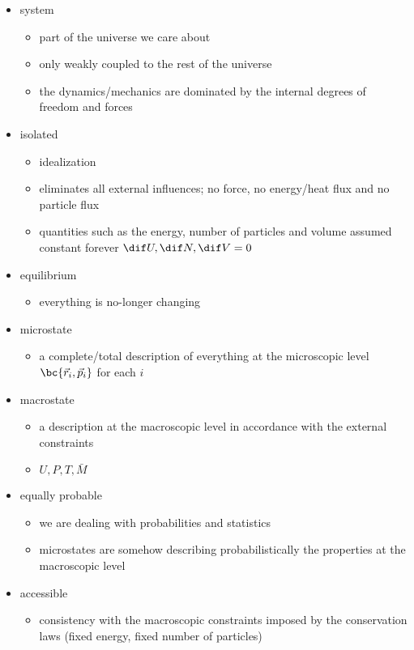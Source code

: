 \documentclass{article}
\begin{document}
\begin{itemize}
    \item system
    \begin{itemize}
        \item part of the universe we care about
        \item only weakly coupled to the rest of the universe
        \item the dynamics/mechanics are dominated by the internal degrees of freedom and forces
    \end{itemize}
    \item isolated
    \begin{itemize}
        \item idealization
        \item eliminates all external influences; no force, no energy/heat flux and no particle flux
        \item quantities such as the energy, number of particles and volume assumed constant forever $\dif U, \dif N, \dif V = 0$
    \end{itemize}
    \item equilibrium
    \begin{itemize}
        \item everything is no-longer changing
    \end{itemize}
    \item microstate
    \begin{itemize}
        \item a complete/total description of everything at the microscopic level $\bc{\vec{r}_i, \vec{p}_i}$ for each $i$
    \end{itemize}
    \item macrostate
    \begin{itemize}
        \item a description at the macroscopic level in accordance with the external constraints
        \item $U, P, T, \bar{M}$
    \end{itemize}
    \item equally probable
    \begin{itemize}
        \item we are dealing with probabilities and statistics
        \item microstates are somehow describing probabilistically the properties at the macroscopic level
    \end{itemize}
    \item accessible
    \begin{itemize}
        \item consistency with the macroscopic constraints imposed by the conservation laws (fixed energy, fixed number of particles)
    \end{itemize}
\end{itemize}
\end{document}
